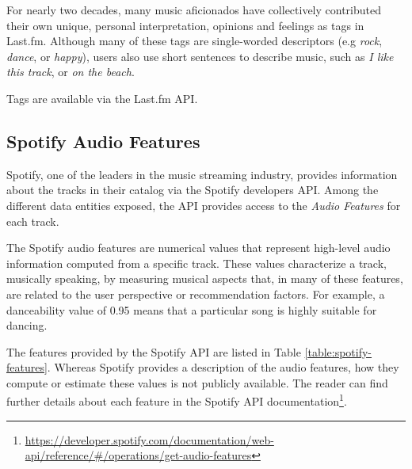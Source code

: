 \documentclass[sn-mathphys]{sn-jnl}%
\theoremstyle{thmstyleone}%
\theoremstyle{thmstyletwo}%
\theoremstyle{thmstylethree}%
\begin{document}
For nearly two decades, many music aficionados have collectively contributed their own unique, personal interpretation, opinions and feelings
as tags in Last.fm.
Although many of these tags are single-worded descriptors (e.g \emph{rock}, \emph{dance}, or \emph{happy}),
users also use short sentences to describe music, such as \emph{I like this track}, or \emph{on the beach}.

Tags are available via the Last.fm API.

\subsection{Spotify Audio Features}

Spotify, one of the leaders in the music streaming industry, provides information about the tracks in their catalog via the Spotify developers API.
Among the different data entities exposed, the API provides access to the \emph{Audio Features} for each track.

The Spotify audio features are numerical values that represent high-level audio information computed from a specific
track. These values characterize a track, musically speaking,
by measuring musical aspects that, in many of these features, are related to the user perspective or recommendation factors.
For example, a danceability value of 0.95 means
that a particular song is highly suitable for dancing.

The features provided by the Spotify API are listed in
Table \ref{table:spotify-features}.
Whereas Spotify provides a description of the audio features,
how they compute or estimate these values is not publicly available.
The reader can find further details about each feature in the Spotify API documentation\footnote[5]{
      \url{https://developer.spotify.com/documentation/web-api/reference/\#/operations/get-audio-features}
}.
\end{document}
